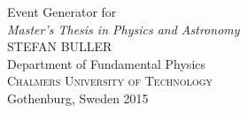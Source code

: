 \begin{titlepage}
\mbox{}
\vfill
\addtolength{\voffset}{2cm}
\begin{flushleft}
	{\noindent \LARGE{Event Generator for \rtb{}} \\[0.3cm]
	\emph{\Large Master's Thesis in Physics and Astronomy} \\[.8cm]
	
	\Large{STEFAN BULLER}\\[.8cm]
	
	{\Large Department of Fundamental Physics \\
	\textsc{Chalmers University of Technology} \\
	Gothenburg, Sweden 2015 \\
	} 
	}
\end{flushleft}
\end{titlepage}
\ClearShipoutPicture
\pagestyle{empty}
\clearpage
\mbox{}
\clearpage
\thispagestyle{empty}

